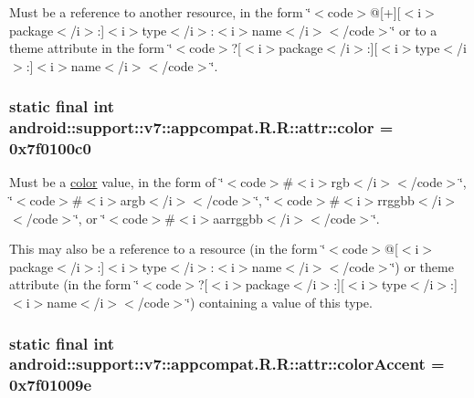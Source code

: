 Must be a reference to another resource, in the form \char`\"{}$<$code$>$@\mbox{[}+\mbox{]}\mbox{[}$<$i$>$package$<$/i$>$:\mbox{]}$<$i$>$type$<$/i$>$:$<$i$>$name$<$/i$>$$<$/code$>$\char`\"{} or to a theme attribute in the form \char`\"{}$<$code$>$?\mbox{[}$<$i$>$package$<$/i$>$:\mbox{]}\mbox{[}$<$i$>$type$<$/i$>$:\mbox{]}$<$i$>$name$<$/i$>$$<$/code$>$\char`\"{}. \hypertarget{classandroid_1_1support_1_1v7_1_1appcompat_1_1_r_1_1attr_a27542af8948575ddf2292191963870f}{
\subsubsection[{color}]{\setlength{\rightskip}{0pt plus 5cm}static final int android::support::v7::appcompat.R.R::attr::color = 0x7f0100c0}}
\label{classandroid_1_1support_1_1v7_1_1appcompat_1_1_r_1_1attr_a27542af8948575ddf2292191963870f}


Must be a \hyperlink{classandroid_1_1support_1_1v7_1_1appcompat_1_1_r_1_1color}{color} value, in the form of \char`\"{}$<$code$>$\#$<$i$>$rgb$<$/i$>$$<$/code$>$\char`\"{}, \char`\"{}$<$code$>$\#$<$i$>$argb$<$/i$>$$<$/code$>$\char`\"{}, \char`\"{}$<$code$>$\#$<$i$>$rrggbb$<$/i$>$$<$/code$>$\char`\"{}, or \char`\"{}$<$code$>$\#$<$i$>$aarrggbb$<$/i$>$$<$/code$>$\char`\"{}. 

This may also be a reference to a resource (in the form \char`\"{}$<$code$>$@\mbox{[}$<$i$>$package$<$/i$>$:\mbox{]}$<$i$>$type$<$/i$>$:$<$i$>$name$<$/i$>$$<$/code$>$\char`\"{}) or theme attribute (in the form \char`\"{}$<$code$>$?\mbox{[}$<$i$>$package$<$/i$>$:\mbox{]}\mbox{[}$<$i$>$type$<$/i$>$:\mbox{]}$<$i$>$name$<$/i$>$$<$/code$>$\char`\"{}) containing a value of this type. \hypertarget{classandroid_1_1support_1_1v7_1_1appcompat_1_1_r_1_1attr_3eaf80e4c15784b4f0238daaaab0a389}{
\subsubsection[{colorAccent}]{\setlength{\rightskip}{0pt plus 5cm}static final int android::support::v7::appcompat.R.R::attr::colorAccent = 0x7f01009e}}
\label{classandroid_1_1support_1_1v7_1_1appcompat_1_1_r_1_1attr_3eaf80e4c15784b4f0238daaaab0a389}


